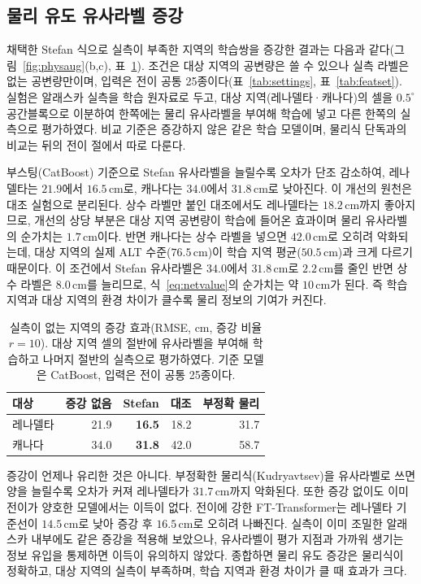 \documentclass[10pt,twocolumn]{article}
\newcommand{\tabhead}[1]{\textbf{#1}}
\begin{document}
\subsection{물리 유도 유사라벨 증강}
채택한 Stefan 식으로 실측이 부족한 지역의 학습쌍을 증강한 결과는 다음과 같다(그림~\ref{fig:physaug}(b,c), 표~\ref{tab:aug}). 조건은 대상 지역의 공변량은 쓸 수 있으나 실측 라벨은 없는 공변량만이며, 입력은 전이 공통 25종이다(표~\ref{tab:settings}, 표~\ref{tab:featset}). 실험은 알래스카 실측을 학습 원자료로 두고, 대상 지역(레나델타·캐나다)의 셀을 $0.5^\circ$ 공간블록으로 이분하여 한쪽에는 물리 유사라벨을 부여해 학습에 넣고 다른 한쪽의 실측으로 평가하였다. 비교 기준은 증강하지 않은 같은 학습 모델이며, 물리식 단독과의 비교는 뒤의 전이 절에서 따로 다룬다.

부스팅(CatBoost) 기준으로 Stefan 유사라벨을 늘릴수록 오차가 단조 감소하여, 레나델타는 $21.9$에서 $16.5\,\mathrm{cm}$로, 캐나다는 $34.0$에서 $31.8\,\mathrm{cm}$로 낮아진다. 이 개선의 원천은 대조 실험으로 분리된다. 상수 라벨만 붙인 대조에서도 레나델타는 $18.2\,\mathrm{cm}$까지 좋아지므로, 개선의 상당 부분은 대상 지역 공변량이 학습에 들어온 효과이며 물리 유사라벨의 순가치는 $1.7\,\mathrm{cm}$이다. 반면 캐나다는 상수 라벨을 넣으면 $42.0\,\mathrm{cm}$로 오히려 악화되는데, 대상 지역의 실제 ALT 수준($76.5\,\mathrm{cm}$)이 학습 지역 평균($50.5\,\mathrm{cm}$)과 크게 다르기 때문이다. 이 조건에서 Stefan 유사라벨은 $34.0$에서 $31.8\,\mathrm{cm}$로 $2.2\,\mathrm{cm}$를 줄인 반면 상수 라벨은 $8.0\,\mathrm{cm}$를 늘리므로, 식~\eqref{eq:netvalue}의 순가치는 약 $10\,\mathrm{cm}$가 된다. 즉 학습 지역과 대상 지역의 환경 차이가 클수록 물리 정보의 기여가 커진다.

\begin{table}[H]
\centering
\footnotesize
\caption{실측이 없는 지역의 증강 효과(RMSE, cm, 증강 비율 $r{=}10$). 대상 지역 셀의 절반에 유사라벨을 부여해 학습하고 나머지 절반의 실측으로 평가하였다. 기준 모델은 CatBoost, 입력은 전이 공통 25종이다.}
\label{tab:aug}
\begin{tabular}{@{}lrrrr@{}}
\toprule
\tabhead{대상} & \tabhead{증강 없음} & \tabhead{Stefan} & \tabhead{대조} & \tabhead{부정확 물리} \\
\midrule
레나델타 & 21.9 & \textbf{16.5} & 18.2 & 31.7 \\
캐나다 & 34.0 & \textbf{31.8} & 42.0 & 58.7 \\
\bottomrule
\end{tabular}
\end{table}

증강이 언제나 유리한 것은 아니다. 부정확한 물리식(Kudryavtsev)을 유사라벨로 쓰면 양을 늘릴수록 오차가 커져 레나델타가 $31.7\,\mathrm{cm}$까지 악화된다. 또한 증강 없이도 이미 전이가 양호한 모델에서는 이득이 없다. 전이에 강한 FT-Transformer는 레나델타 기준선이 $14.5\,\mathrm{cm}$로 낮아 증강 후 $16.5\,\mathrm{cm}$로 오히려 나빠진다. 실측이 이미 조밀한 알래스카 내부에도 같은 증강을 적용해 보았으나, 유사라벨이 평가 지점과 가까워 생기는 정보 유입을 통제하면 이득이 유의하지 않았다. 종합하면 물리 유도 증강은 물리식이 정확하고, 대상 지역의 실측이 부족하며, 학습 지역과 환경 차이가 클 때 효과가 크다.
\end{document}
